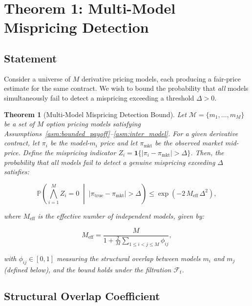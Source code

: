 \documentclass[11pt,a4paper]{article}
\theoremstyle{plain}
\newtheorem{theorem}{Theorem}[section]
\theoremstyle{definition}
\theoremstyle{remark}
\newcommand{\Pbb}{\mathbb{P}}
\newcommand{\indicator}{\mathbf{1}}
\newcommand{\F}{\mathcal{F}}
\newcommand{\M}{\mathcal{M}}
\begin{document}
\section{Theorem 1: Multi-Model Mispricing Detection}

\subsection{Statement}

Consider a universe of $M$ derivative pricing models, each producing a fair-price estimate for the same contract. We wish to bound the probability that \emph{all} models simultaneously fail to detect a mispricing exceeding a threshold $\Delta > 0$.

\begin{theorem}[Multi-Model Mispricing Detection Bound]\label{thm:multi_model_mispricing}
Let $\M = \{m_1, \dots, m_M\}$ be a set of $M$ option pricing models satisfying Assumptions~\ref{asm:bounded_payoff}--\ref{asm:inter_model}. For a given derivative contract, let $\pi_i$ be the model-$m_i$ price and let $\pi_{\text{mkt}}$ be the observed market mid-price. Define the mispricing indicator $Z_i = \indicator\{|\pi_i - \pi_{\text{mkt}}| > \Delta\}$. Then, the probability that all models fail to detect a genuine mispricing exceeding $\Delta$ satisfies:

\begin{equation}\label{eq:thm1_bound}
  \Pbb\!\left(\bigwedge_{i=1}^{M} Z_i = 0 \;\middle|\; |\pi_{\text{true}} - \pi_{\text{mkt}}| > \Delta\right) \leq \exp\!\left(-2\,M_{\text{eff}}\,\Delta^2\right),
\end{equation}

where $M_{\text{eff}}$ is the \emph{effective number of independent models}, given by:

\begin{equation}\label{eq:Meff}
  M_{\text{eff}} = \frac{M}{1 + \frac{2}{M}\sum_{1 \leq i < j \leq M} \phi_{ij}},
\end{equation}

with $\phi_{ij} \in [0,1]$ measuring the structural overlap between models $m_i$ and $m_j$ (defined below), and the bound holds under the filtration $\F_t$.
\end{theorem}

\subsection{Structural Overlap Coefficient}
\end{document}
